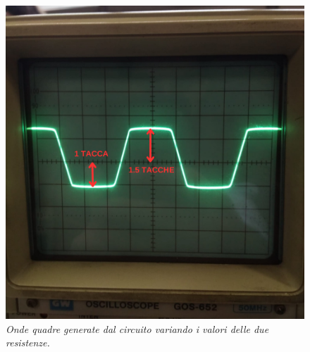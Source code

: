 \begin{figure}[h]
    \includegraphics[width=\textwidth]{../assets/Resistenze_Diverse2.png}
    \caption{\emph{Onde quadre generate dal circuito variando i valori delle due resistenze.}}
    \label{fig : dati raccolti}
  \end{figure}